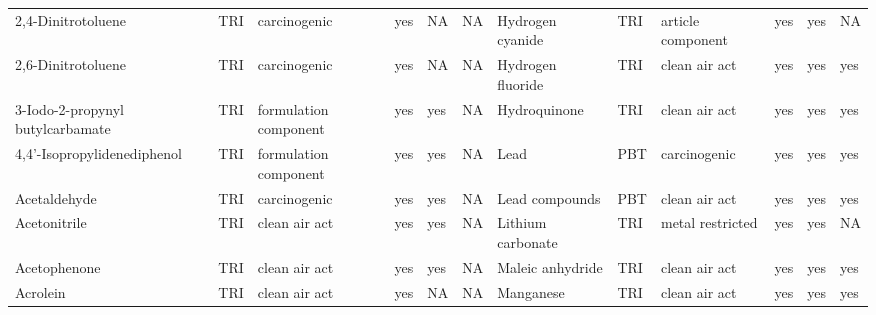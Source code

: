 \begin{table}[H]
{\begin{tabular}{llllllllllll}
            2,4-Dinitrotoluene                                                         & TRI            & carcinogenic          & yes    & NA      & NA   & Hydrogen cyanide                                                                                                   & TRI            & article component & yes & yes & NA\\
            2,6-Dinitrotoluene                                                         & TRI            & carcinogenic          & yes    & NA      & NA   & Hydrogen fluoride                                                                                                  & TRI            & clean air act & yes & yes & yes\\
            3-Iodo-2-propynyl butylcarbamate                                           & TRI            & formulation component & yes    & yes     & NA   & Hydroquinone & TRI & clean air act & yes & yes & yes\\
            4,4'-Isopropylidenediphenol                                                & TRI            & formulation component & yes    & yes     & NA   & Lead                                                                                                               & PBT            & carcinogenic & yes & yes & yes\\
            Acetaldehyde                                                               & TRI            & carcinogenic          & yes    & yes     & NA   & Lead compounds                                                                                                     & PBT            & clean air act         & yes    & yes & yes\\
            Acetonitrile                                                               & TRI            & clean air act         & yes    & yes     & NA   & Lithium carbonate                                                                                                  & TRI            & metal restricted & yes & yes & NA\\
            Acetophenone                                                               & TRI            & clean air act         & yes    & yes     & NA   & Maleic anhydride                                                                                                   & TRI            & clean air act         & yes & yes & yes\\
            Acrolein                                                                   & TRI            & clean air act         & yes    & NA      & NA   & Manganese                                                                                                          & TRI            & clean air act         & yes    & yes     & yes  \\

\end{tabular}}
\end{table}
